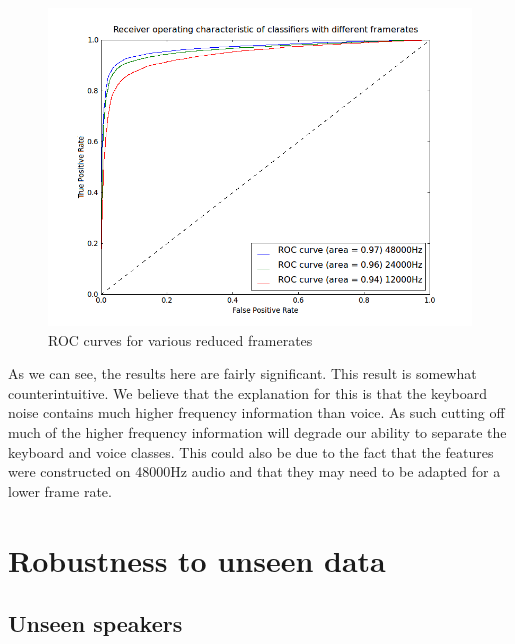 \documentclass[ %
                    author={Sam Phippen},
                supervisor={Dr. Rafal Bogacz},
                     title={Real time voice activity detectors in noisy personal computing environments},
                  subtitle={},
                    degree={MEng},
                      year={2012} ]{thesis}
\begin{document}
\begin{figure}
    \label{fig:roc-frameratecrush}
    \includegraphics[width=15cm]{roc_framerates.png}
    \caption{ROC curves for various reduced framerates}
\end{figure}

As we can see, the results here are fairly significant. This result is somewhat
counterintuitive. We believe that the explanation for this is that the keyboard
noise contains much higher frequency information than voice. As such cutting
off much of the higher frequency information will degrade our ability to
separate the keyboard and voice classes. This could also be due to the fact
that the features were constructed on 48000Hz audio and that they may need to
be adapted for a lower frame rate.

\section {Robustness to unseen data}

\subsection{Unseen speakers}
\end{document}
